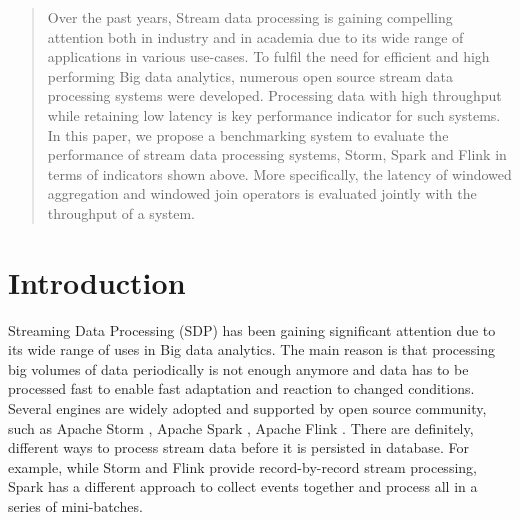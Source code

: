 \documentclass{vldb}
\begin{document}
\date{30 July 1999}


\maketitle

\begin{abstract}
Over the past years, Stream data processing is gaining compelling attention both in industry and in academia due to its wide range of applications in various use-cases. To fulfil the need for efficient and high performing  Big data analytics, numerous open source stream data processing systems were developed. Processing data with high throughput while retaining low latency is key performance indicator for such systems. In this paper, we propose a benchmarking system to evaluate the performance of stream  data processing systems, Storm, Spark and Flink  in terms of indicators shown above. More specifically, the latency of windowed aggregation and windowed join operators is evaluated jointly  with the throughput of a system. 
\end{abstract}




\section{Introduction}
Streaming Data Processing (SDP) has been gaining significant attention due to its wide range of uses in Big data analytics. The main reason is that processing big volumes of data periodically is not enough anymore and data has to be processed fast to enable fast adaptation and reaction to changed conditions. Several engines are widely adopted and supported by open source community, such as Apache Storm \cite{toshniwal2014storm}, Apache Spark  \cite{zaharia2012discretized} , Apache Flink \cite{carbone2015apache}. There are definitely, different ways to process stream data before it is persisted in database. For example, while Storm and Flink provide record-by-record stream processing, Spark has a different approach to collect events together and process all in a series of  mini-batches. 
\end{document}

